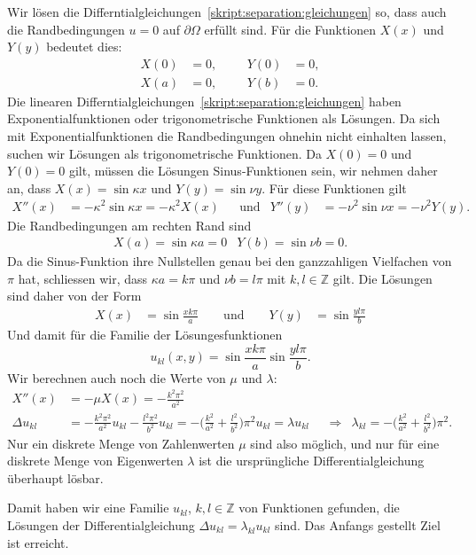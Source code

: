Wir lösen die Differntialgleichungen~\eqref{skript:separation:gleichungen}
so, dass auch die Randbedingungen $u=0$ auf $\partial\Omega$ erfüllt sind.
Für die Funktionen $X(x)$ und $Y(y)$ bedeutet dies:
\[
\begin{aligned}
X(0)&=0,&&& Y(0) &= 0,\\
X(a)&=0,&&& Y(b) &= 0.
\end{aligned}
\]
Die linearen Differntialgleichungen~\eqref{skript:separation:gleichungen}
haben Exponentialfunktionen oder trigonometrische Funktionen als
Lösungen.
Da sich mit Exponentialfunktionen die Randbedingungen ohnehin nicht
einhalten lassen, suchen wir Lösungen als trigonometrische Funktionen.
Da $X(0)=0$ und $Y(0)=0$ gilt, müssen die Lösungen Sinus-Funktionen sein,
wir nehmen daher an, dass $X(x)=\sin \kappa x$ und $Y(y)=\sin \nu y$.
Für diese Funktionen gilt
\[
\begin{aligned}
X''(x) &= -\kappa^2\sin \kappa x = -\kappa^2 X(x)
&&\text{und}&
Y''(y) &= -\nu^2\sin \nu x = -\nu^2 Y(y).
\end{aligned}
\]
Die Randbedingungen am rechten Rand sind
\[
\begin{aligned}
X(a) = \sin \kappa a = 0
&
Y(b) = \sin \nu b = 0.
\end{aligned}
\]
Da die Sinus-Funktion ihre Nullstellen genau bei den ganzzahligen Vielfachen
von $\pi$ hat, schliessen wir, dass $\kappa a = k\pi$ und $\nu b = l\pi$
mit $k,l\in\mathbb Z$ gilt.
Die Lösungen sind daher von der Form
\[
\begin{aligned}
X(x) &= \sin \frac{xk\pi}{a}
\qquad \text{und} \qquad
Y(y) &= \sin\frac{yl\pi}{b}
\end{aligned}
\]
Und damit für die Familie der Lösungesfunktionen
\[
u_{kl}(x,y) = \sin \frac{xk\pi}{a} \sin\frac{yl\pi}{b}.
\]
Wir berechnen auch noch die Werte von $\mu$ und $\lambda$:
\begin{align*}
X''(x)
&=
-\mu X(x) = -\frac{k^2\pi^2}{a^2}
\\
\Delta u_{kl}
&=
-\frac{k^2\pi^2}{a^2} u_{kl}
-\frac{l^2\pi^2}{b^2} u_{kl}
=
-\biggl(\frac{k^2}{a^2}+\frac{l^2}{b^2}\biggr)\pi^2 u_{kl}
=
\lambda  u_{kl}
&&\Rightarrow&
\lambda_{kl} = - \biggl(\frac{k^2}{a^2}+\frac{l^2}{b^2}\biggr)\pi^2.
\end{align*}
Nur ein diskrete Menge von Zahlenwerten $\mu$ sind also möglich, und nur 
für eine diskrete Menge von Eigenwerten $\lambda$ ist die ursprüngliche 
Differentialgleichung überhaupt lösbar.

Damit haben wir eine Familie $u_{kl}$, $k,l\in\mathbb Z$ von Funktionen
gefunden, die Lösungen der Differentialgleichung
$\Delta u_{kl}=\lambda_{kl} u_{kl}$ sind.
Das Anfangs gestellt Ziel ist erreicht.


